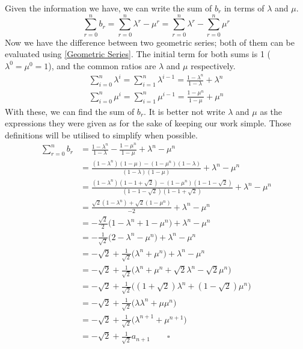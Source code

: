 \documentclass[12pt]{article}
\begin{document}
Given the information we have, we can write the sum of $b_r$ in terms of $\lambda$ and $\mu$.
\begin{equation*}
    \sum_{r=0}^{n} b_r = \sum_{r=0}^{n} \lambda^r - \mu^r = \sum_{r=0}^{n} \lambda^r - \sum_{r=0}^{n} \mu^r
\end{equation*}
Now we have the difference between two geometric series; both of them can be evaluated using \eqref{Geometric Series}.
The initial term for both sums is 1 ($\lambda^0=\mu^0=1$), and the common ratios are $\lambda$ and $\mu$ respectively.
\begin{align}
    \sum_{i=0}^{n} \lambda^i = \sum_{i=1}^{n} \lambda^{i-1} = \frac{1-\lambda^n}{1-\lambda} + \lambda^n \\
    \sum_{i=0}^{n} \mu^i = \sum_{i=1}^{n} \mu^{i-1} = \frac{1-\mu^n}{1-\mu} + \mu^n
\end{align}
With these, we can find the sum of $b_r$.
It is better not write $\lambda$ and $\mu$ as the expressions they were given as for the sake of keeping our work simple.
Those definitions will be utilised to simplify when possible.
\begin{align*}
    \sum_{r=0}^{n} b_r & = \frac{1-\lambda^n}{1-\lambda} - \frac{1-\mu^n}{1-\mu} + \lambda^n - \mu^n                                      \\
                       & = \frac{(1-\lambda^n)(1-\mu) - (1-\mu^n)(1-\lambda)}{(1-\lambda)(1-\mu)} + \lambda^n - \mu^n                     \\
                       & = \frac{(1-\lambda^n)(1-1+\sqrt{2}) - (1-\mu^n)(1-1-\sqrt{2})}{(1-1-\sqrt{2})(1-1+\sqrt{2})} + \lambda^n - \mu^n \\
                       & = \frac{\sqrt{2}(1-\lambda^n) + \sqrt{2}(1-\mu^n)}{-2} + \lambda^n - \mu^n                                       \\
                       & = -\frac{\sqrt{2}}{2}\bigg(1-\lambda^n+1-\mu^n\bigg) + \lambda^n - \mu^n                                         \\
                       & = -\frac{1}{\sqrt{2}}\bigg(2-\lambda^n-\mu^n\bigg) + \lambda^n - \mu^n                                           \\
                       & = -\sqrt{2} + \frac{1}{\sqrt{2}}\bigg(\lambda^n+\mu^n\bigg) + \lambda^n - \mu^n                                  \\
                       & = -\sqrt{2} + \frac{1}{\sqrt{2}}\bigg(\lambda^n+\mu^n + \sqrt{2}\lambda^n - \sqrt{2}\mu^n\bigg)                  \\
                       & = -\sqrt{2} + \frac{1}{\sqrt{2}}\bigg(\left(1+\sqrt{2}\right)\lambda^n + \left(1-\sqrt{2}\right)\mu^n\bigg)      \\
                       & = -\sqrt{2} + \frac{1}{\sqrt{2}}\bigg(\lambda\lambda^n + \mu\mu^n\bigg)                                          \\
                       & = -\sqrt{2} + \frac{1}{\sqrt{2}}\bigg(\lambda^{n+1} + \mu^{n+1}\bigg)                                            \\
                       & = -\sqrt{2} + \frac{1}{\sqrt{2}}a_{n+1} \qquad \square
\end{align*}
\end{document}
